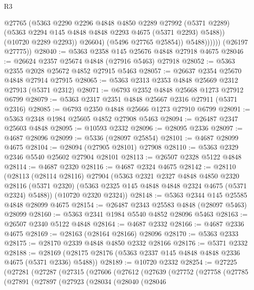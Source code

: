 \begin{lexlean}{R3}
\begin{coremodule}
                        @27765
                        (@5363
                          @2290
                          @2296
                          @4848
                          @4850
                          @2289
                          @27992
                          (@5371 @2289)
                          (@5363 @2294 @145 @4848 @4848 @2293 @4675 (@5371 @2293) @5488))
                        (@10720 @2289 @2293))
                      @26604)
                    (@5496 @27765 @25854))
                  @5488))))))
      (@26197 @27775))
@28040 := @5363 @2358 @145 @25676 @4848 @27918 @4675
@28046 := @26624 @2357 @25674 @4848 (@27916 @5463) @27918
@28052 := @5363 @2355 @2028 @25672 @4852 @27915 @5463
@28057 := @26637 @2354 @25670 @4848 @27914 @27915
@28065 := @5363 @2313 @2353 @4848 @25669 @2312 @27913 (@5371 @2312)
@28071 := @6793 @2352 @4848 @25668 @1273 @27912 @6799
@28079 := @5363 @2317 @2351 @4848 @25667 @2316 @27911 (@5371 @2316)
@28085 := @6793 @2350 @4848 @25666 @1273 @27910 @6799
@28091 := @5363 @2348 @1984 @25605 @4852 @27908 @5463
@28094 := @26487 @2347 @25603 @4848
@28095 := @10593 @2332
@28096 := @28095 @2336
@28097 := @4687 @28096
@28099 := @5336 (@28097 @25854)
@28101 := @4687 @28099 @4675
@28104 := @28094 (@27905 @28101) @27908
@28110 := @5363 @2329 @2346 @5540 @25602 @27904 @28101
@28113 := @26507 @2328 @5122 @4848
@28114 := @4687 @2320
@28116 := @4687 @2324 @4675
@28142 := @28110
    (@28113
      (@28114 @28116)
      @27904
      (@5363
        @2321
        @2327
        @4848
        @4850
        @2320
        @28116
        (@5371 @2320)
        (@5363 @2325 @145 @4848 @4848 @2324 @4675 (@5371 @2324) @5488))
      (@10720 @2320 @2324))
@28148 := @5363 @2344 @145 @25585 @4848 @28099 @4675
@28154 := @26487 @2343 @25583 @4848 (@28097 @5463) @28099
@28160 := @5363 @2341 @1984 @5540 @4852 @28096 @5463
@28163 := @26507 @2340 @5122 @4848
@28164 := @4687 @2332
@28166 := @4687 @2336 @4675
@28169 := @28163 (@28164 @28166) @28096
@28170 := @5363 @2333
@28175 := @28170 @2339 @4848 @4850 @2332 @28166
@28176 := @5371 @2332
@28188 := @28169 (@28175 @28176 (@5363 @2337 @145 @4848 @4848 @2336 @4675 (@5371 @2336) @5488))
@28189 := @10720 @2332
@28254 := @27225
    (@27281
      (@27287
        (@27315
          (@27606
            (@27612
              (@27639
                (@27752
                  (@27758
                    (@27785
                      (@27891
                        (@27897
                          (@27923
                            (@28034
                              (@28040
                                (@28046

\end{coremodule}
\end{lexlean}
